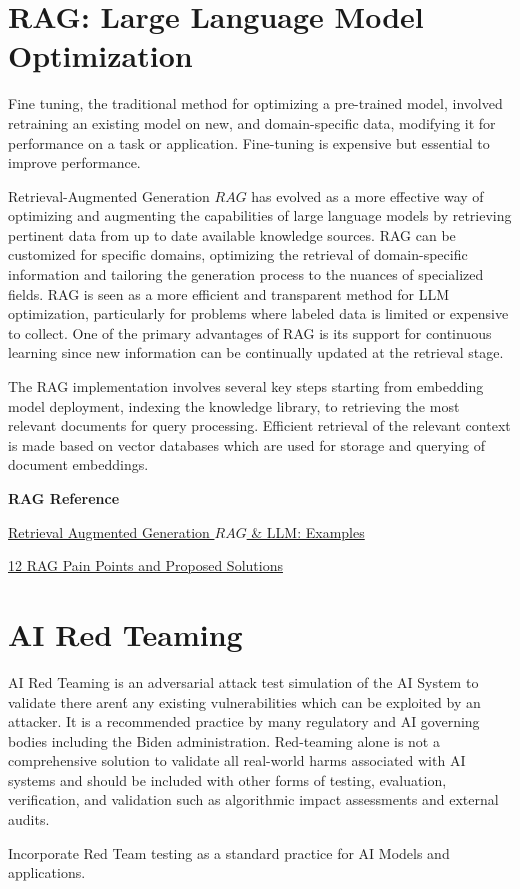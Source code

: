 \section{RAG: Large Language Model Optimization}
Fine tuning, the traditional method for optimizing a pre-trained model, involved retraining an existing model on new, and domain-specific data, modifying it for performance on a task or application. Fine-tuning is expensive but essential to improve performance.

Retrieval-Augmented Generation \(RAG\) has evolved as a more effective way of optimizing and augmenting the capabilities of large language models by retrieving pertinent data from up to date available knowledge sources. RAG can be customized for specific domains, optimizing the retrieval of domain-specific information and tailoring the generation process to the nuances of specialized fields. RAG is seen as a more efficient and transparent method for LLM optimization, particularly for problems where labeled data is limited or expensive to collect. One of the primary advantages of RAG is its support for continuous learning since new information can be continually updated at the retrieval stage.

The RAG implementation involves several key steps starting from embedding model deployment, indexing the knowledge library, to retrieving the most relevant documents for query processing. Efficient retrieval of the relevant context is made based on vector databases which are used for storage and querying of document embeddings.

\textbf{RAG Reference}

\begin{minipage}{\linewidth}
\begin{checklist}
  \item \href{https://vitalflux.com/retrieval-augmented-generation-rag-llm-examples/}{Retrieval Augmented Generation \(RAG\) \& LLM: Examples}
  \item \href{https://towardsdatascience.com/12-rag-pain-points-and-proposed-solutions-43709939a28c}{12 RAG Pain Points and Proposed Solutions}
\end{checklist}
\end{minipage}

\section{AI Red Teaming}
AI Red Teaming is an adversarial attack test simulation of the AI System to validate there aren\'t any existing vulnerabilities which can be exploited by an attacker. It is a recommended practice by many regulatory and AI governing bodies including the Biden administration. Red-teaming alone is not a comprehensive solution to validate all real-world harms associated with AI systems and should be included with other forms of testing, evaluation, verification, and validation such as algorithmic impact assessments and external audits.

\begin{minipage}{\linewidth}
\begin{checklist}
  \item Incorporate Red Team testing as a standard practice for AI Models and
  applications.
\end{checklist}
\end{minipage}
